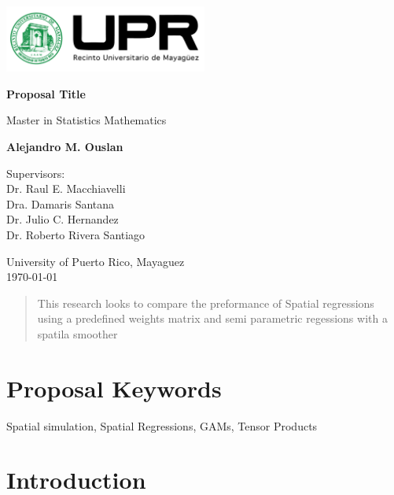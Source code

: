 \documentclass{article}
\begin{document}
\begin{titlepage}
	\centering
	\vspace*{1cm}

	\includegraphics[width=0.5\textwidth]{assets/logo.png}\par\vspace{1cm} %

	\Huge
	\textbf{Proposal Title}

	\vspace{0.5cm}
	\LARGE
	Master in Statistics Mathematics

	\vspace{1.5cm}


	\textbf{Alejandro M. Ouslan}

	\vfill

	\Large
	Supervisors: \\
	Dr. Raul E. Macchiavelli \\
	Dra. Damaris Santana \\
	Dr. Julio C. Hernandez \\
	Dr. Roberto Rivera Santiago

	\vspace{0.8cm}

	\Large
	University of Puerto Rico, Mayaguez \\
	{\small \today}

\end{titlepage}


\newpage


\begin{abstract}
	This research looks to compare the preformance of Spatial regressions using a predefined
	weights matrix and semi parametric regessions with a spatila smoother
\end{abstract}
\section{Proposal Keywords}
Spatial simulation, Spatial Regressions, GAMs, Tensor Products

\section{Introduction}
\end{document}
